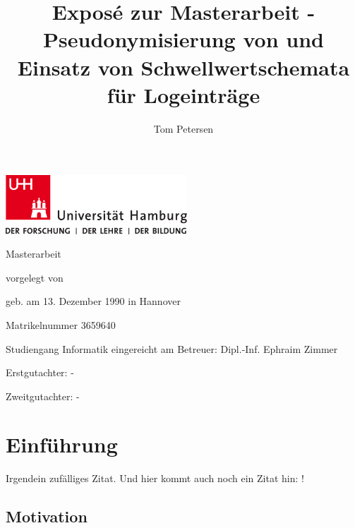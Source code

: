 \documentclass[
    fontsize=12pt,
    headings=small,
    parskip=half,           %
    bibliography=totoc,
    numbers=noenddot,       %
    open=any,               %
    ]{scrreprt}
\title{Exposé zur Masterarbeit - Pseudonymisierung von und Einsatz von Schwellwertschemata für Logeinträge}
\author{Tom Petersen}
\begin{document}
\newpage
\thispagestyle{empty}
\begin{titlepage}%
\includegraphics[width=6.8cm]{./img/up-uhh-logo-u-2010-u-farbe-u-rgb.pdf}
\begin{center}\Large
	\vfill
	Masterarbeit
	\vfill
	\makeatletter
	{\Large\textsf{\textbf{\@title}}\par}
	\makeatother
	\vfill
	vorgelegt von
	\par\bigskip
	\makeatletter
	{\@author} \par
	\makeatother
	geb. am 13. Dezember 1990 in Hannover\par
	Matrikelnummer 3659640 \par
	Studiengang Informatik
	\vfill
	\makeatletter
	eingereicht am {\@date}
	\makeatother
	\vfill
	Betreuer: Dipl.-Inf. Ephraim Zimmer\par
	Erstgutachter: - \par
	Zweitgutachter: -
\end{center}
\end{titlepage}%



\chapter{Einführung}

Irgendein zufälliges \cite{Lamp1981} Zitat. Und hier kommt auch noch ein Zitat hin: \cite{Beut2009}!

\section{Motivation}
\end{document}
